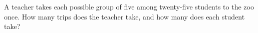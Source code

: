 A teacher takes each possible group of five among twenty-five students to the zoo once. How many trips does the teacher take, and how many does each student take?
